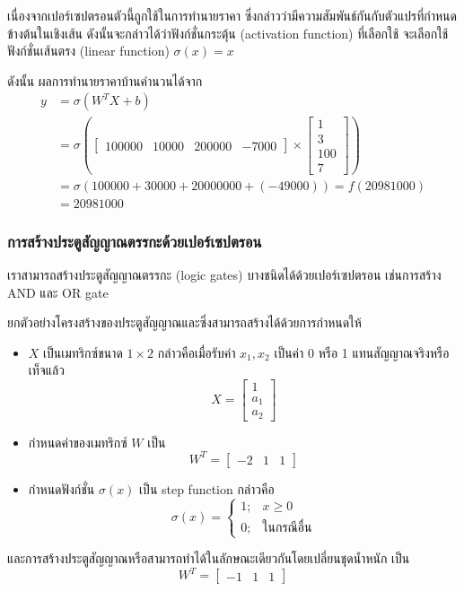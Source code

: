 \documentclass{cpereport}
\begin{document}
เนื่องจากเปอร์เซปตรอนตัวนี้ถูกใช้ในการทำนายราคา ซึ่งกล่าวว่ามีความสัมพันธ์กันกับตัวแปรที่กำหนดข้างต้นในเชิงเส้น ดังนั้นจะกล่าวได้ว่าฟังก์ชั่นกระตุ้น (activation function) ที่เลือกใช้ จะเลือกใช้ฟังก์ชั่นเส้นตรง (linear function) $\sigma(x) = x$

ดังนั้น ผลการทำนายราคาบ้านคำนวนได้จาก
$$
    \begin{aligned}
        y &= \sigma\left(W^TX+b\right)\\
        &= \sigma\left(\begin{bmatrix}
            100000 & 10000 & 200000 & -7000
        \end{bmatrix} \times \begin{bmatrix}
            1 \\
            3 \\
            100 \\
            7
        \end{bmatrix}\right)\\
        &= \sigma(100000 + 30000 + 20000000 + (-49000)) = f(20981000)\\
        &= 20981000
    \end{aligned}
$$

\subsubsection{การสร้างประตูสัญญาณตรรกะด้วยเปอร์เซปตรอน}
เราสามารถสร้างประตูสัญญาณตรรกะ (logic gates) บางชนิดได้ด้วยเปอร์เซปตรอน เช่นการสร้าง AND และ OR gate

ยกตัวอย่างโครงสร้างของประตูสัญญาณและซึ่งสามารถสร้างได้ด้วยการกำหนดให้
\begin{itemize}
    \item $X$ เป็นเมทริกซ์ขนาด $1 \times 2$ กล่าวคือเมื่อรับค่า $x_1, x_2$ เป็นค่า 0 หรือ 1 แทนสัญญาณจริงหรือเท็จแล้ว
        $$X = \begin{bmatrix}
            1 \\
            a_1 \\
            a_2
        \end{bmatrix}$$
    \item กำหนดค่าของเมทริกซ์ $W$ เป็น
        $$W^T = \begin{bmatrix}
            -2 & 1 & 1
        \end{bmatrix}$$
    \item กำหนดฟังก์ชั่น $\sigma(x)$ เป็น step function กล่าวคือ
    $$
        \sigma(x) = \begin{cases}
            1; & x \geq 0\\
            0; & \textrm{ในกรณีอื่น}
        \end{cases}
    $$
\end{itemize}
และการสร้างประตูสัญญาณหรือสามารถทำได้ในลักษณะเดียวกันโดยเปลี่ยนชุดน้ำหนัก เป็น
        $$W^T = \begin{bmatrix}
            -1 & 1 & 1
        \end{bmatrix}$$
\end{document}
